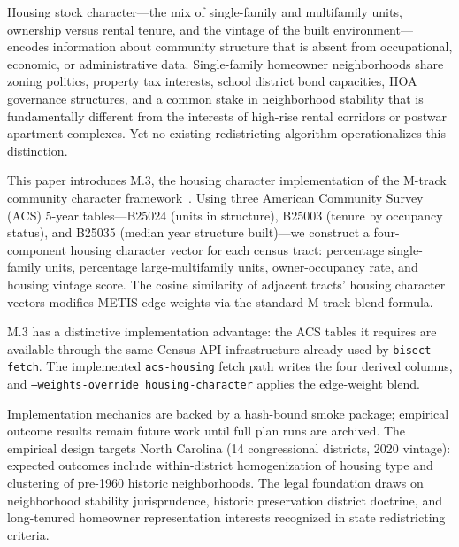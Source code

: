Housing stock character---the mix of single-family and multifamily units,
ownership versus rental tenure, and the vintage of the built environment---
encodes information about community structure that is absent from occupational,
economic, or administrative data.
Single-family homeowner neighborhoods share zoning politics, property tax
interests, school district bond capacities, HOA governance structures, and a
common stake in neighborhood stability that is fundamentally different from
the interests of high-rise rental corridors or postwar apartment complexes.
Yet no existing redistricting algorithm operationalizes this distinction.

This paper introduces M.3, the housing character implementation of the
M-track community character framework~\citep{m0framework}.
Using three American Community Survey (ACS) 5-year tables---B25024
(units in structure), B25003 (tenure by occupancy status), and B25035
(median year structure built)---we construct a four-component housing
character vector for each census tract:
percentage single-family units, percentage large-multifamily units,
owner-occupancy rate, and housing vintage score.
The cosine similarity of adjacent tracts' housing character vectors
modifies METIS edge weights via the standard M-track blend formula.

M.3 has a distinctive implementation advantage: the ACS tables it requires are
available through the same Census API infrastructure already used by
\texttt{bisect fetch}. The implemented \texttt{acs-housing} fetch path writes
the four derived columns, and \texttt{--weights-override housing-character}
applies the edge-weight blend.

Implementation mechanics are backed by a hash-bound smoke package; empirical
outcome results remain future work until full plan runs are archived.
The empirical design targets North Carolina (14 congressional districts,
2020 vintage): expected outcomes include within-district homogenization of
housing type and clustering of pre-1960 historic neighborhoods.
The legal foundation draws on neighborhood stability jurisprudence,
historic preservation district doctrine, and long-tenured homeowner
representation interests recognized in state redistricting criteria.
